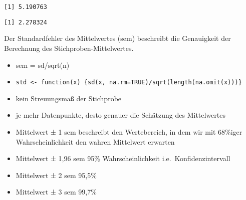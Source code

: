 \documentclass[
  letterpaper,
  DIV=11,
  numbers=noendperiod]{scrartcl}
\newenvironment{Shaded}{\begin{snugshade}}{\end{snugshade}}
\newcommand{\AttributeTok}[1]{\textcolor[rgb]{0.40,0.45,0.13}{#1}}
\newcommand{\CommentTok}[1]{\textcolor[rgb]{0.37,0.37,0.37}{#1}}
\newcommand{\ConstantTok}[1]{\textcolor[rgb]{0.56,0.35,0.01}{#1}}
\newcommand{\ControlFlowTok}[1]{\textcolor[rgb]{0.00,0.23,0.31}{#1}}
\newcommand{\FunctionTok}[1]{\textcolor[rgb]{0.28,0.35,0.67}{#1}}
\newcommand{\NormalTok}[1]{\textcolor[rgb]{0.00,0.23,0.31}{#1}}
\newcommand{\OtherTok}[1]{\textcolor[rgb]{0.00,0.23,0.31}{#1}}
\newcommand{\SpecialCharTok}[1]{\textcolor[rgb]{0.37,0.37,0.37}{#1}}
\providecommand{\tightlist}{%
  \setlength{\itemsep}{0pt}\setlength{\parskip}{0pt}}\usepackage{longtable,booktabs,array}
\begin{document}
\begin{Shaded}
\end{Shaded}

\begin{verbatim}
[1] 5.190763
\end{verbatim}

\begin{Shaded}
\end{Shaded}

\begin{verbatim}
[1] 2.278324
\end{verbatim}

Der Standardfehler des Mittelwertes (sem) beschreibt die Genauigkeit der
Berechnung des Stichproben-Mittelwertes.

\begin{itemize}
\tightlist
\item
  sem = sd/sqrt(n)
\item
  \texttt{std\ \textless{}-\ function(x)\ \{sd(x,\ na.rm=TRUE)/sqrt(length(na.omit(x)))\}}
\item
  kein Streuungsmaß der Stichprobe
\item
  je mehr Datenpunkte, desto genauer die Schätzung des Mittelwertes
\item
  Mittelwert ± 1 sem beschreibt den Wertebereich, in dem wir mit
  68\%iger Wahrscheinlichkeit den wahren Mittelwert erwarten
\item
  Mittelwert ± 1,96 sem 95\% Wahrscheinlichkeit i.e.~Konfidenzintervall
\item
  Mittelwert ± 2 sem 95,5\%
\item
  Mittelwert ± 3 sem 99,7\%
\end{itemize}

\begin{Shaded}
\end{Shaded}
\end{document}

